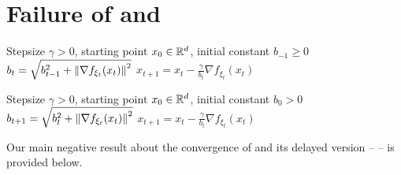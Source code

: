 \documentclass{article}
\begin{document}
\section{Failure of  and }\label{section:failure}

\begin{minipage}{0.49\textwidth}
    \begin{algorithm}[H]
   \caption{}
   \label{alg:adagrad}
   \centering
\begin{algorithmic}[1]
  \REQUIRE Stepsize $\gamma > 0$, starting point $x_0 \in {\mathbb R}^d$, initial constant $b_{-1} \geq 0$
        \STATE $b_t = \sqrt{b_{t-1}^2 + {\left\lVert\nabla f_{\xi_t}(x_t)\right\rVert}^2}$
        \STATE $x_{t+1} = x_t - \frac{\gamma}{b_{t}}\nabla f_{{\xi_t}}(x_t)$
   \ENDFOR
\end{algorithmic}
\end{algorithm}
\end{minipage}
\hfill
\begin{minipage}{0.49\textwidth}
    \begin{algorithm}[H]
   \caption{ with Delay ()}
   \label{alg:adagradD}
   \centering
\begin{algorithmic}[1]
  \REQUIRE Stepsize $\gamma > 0$, starting point $x_0 \in {\mathbb R}^d$, initial constant $b_{0} > 0$
        \STATE $b_{t+1} = \sqrt{b_{t}^2 + {\left\lVert\nabla f_{\xi_t}(x_t)\right\rVert}^2}$
        \STATE $x_{t+1} = x_t - \frac{\gamma}{b_{t}}\nabla f_{{\xi_t}}(x_t)$
   \ENDFOR
\end{algorithmic}
\end{algorithm}
\end{minipage}

Our main negative result about the convergence of  and its delayed version --  \citep{li2020high} -- is provided below.
\end{document}
